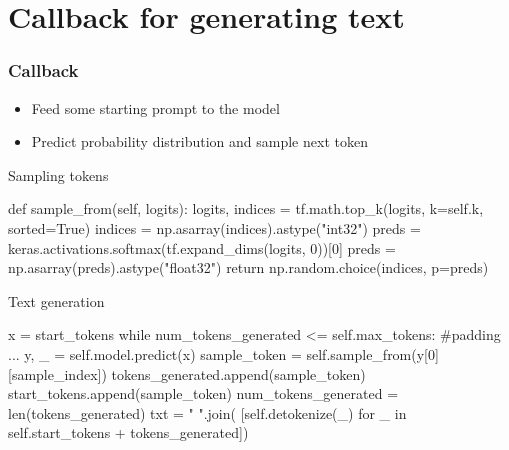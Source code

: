 \documentclass[17pt,institute=e10]{tuhh_presentation}
\begin{document}
\section{Callback for generating text}

\begin{frame}[fragile]
  \frametitle{Callback}
  \vspace{-1cm}
  \begin{itemize}
    \item Feed some starting prompt to the model
    \item Predict probability distribution and sample next token
  \end{itemize}

  \pause

  \begin{block}{Sampling tokens}
    \begin{python}
        def sample_from(self, logits):
        logits, indices = tf.math.top_k(logits, k=self.k, sorted=True)
        indices = np.asarray(indices).astype("int32")
        preds = keras.activations.softmax(tf.expand_dims(logits, 0))[0]
        preds = np.asarray(preds).astype("float32")
        return np.random.choice(indices, p=preds)
    \end{python}
  \end{block}

  \pause

\begin{block}{Text generation}
  \begin{python}
        x = start_tokens
        while num_tokens_generated <= self.max_tokens:
          #padding
          ...
            y, _ = self.model.predict(x)
            sample_token = self.sample_from(y[0][sample_index])
            tokens_generated.append(sample_token)
            start_tokens.append(sample_token)
            num_tokens_generated = len(tokens_generated)
        txt = " ".join( [self.detokenize(_) for _ in self.start_tokens + tokens_generated])
  \end{python}
\end{block}

\end{frame}
\end{document}

